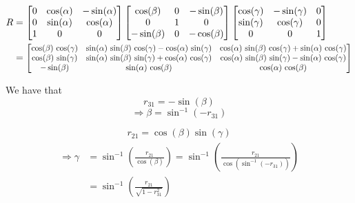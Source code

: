 \begin{align}
    R & =
    \begin{bmatrix}
        0 & \cos(\alpha) & -\sin(\alpha) \\
        0 & \sin(\alpha) & \cos(\alpha)  \\
        1 & 0            & 0             \\
    \end{bmatrix}
    \begin{bmatrix}
        \cos(\beta)  & 0 & -\sin(\beta) \\
        0            & 1 & 0            \\
        -\sin(\beta) & 0 & -\cos(\beta)
    \end{bmatrix}
    \begin{bmatrix}
        \cos(\gamma) & -\sin(\gamma) & 0 \\
        \sin(\gamma) & \cos(\gamma)  & 0 \\
        0            & 0             & 1
    \end{bmatrix} \nonumber \\
      & =
    \scalemath{0.85}{
        \begin{bmatrix}
            \cos(\beta)\,\cos(\gamma) & \sin(\alpha)\,\sin(\beta)\,\cos(\gamma) - \cos(\alpha)\,\sin(\gamma) & \cos(\alpha)\,\sin(\beta)\,\cos(\gamma) + \sin(\alpha)\,\cos(\gamma) \\
            \cos(\beta)\,\sin(\gamma) & \sin(\alpha)\,\sin(\beta)\,\sin(\gamma) + \cos(\alpha)\,\cos(\gamma) & \cos(\alpha)\,\sin(\beta)\,\sin(\gamma) - \sin(\alpha)\,\cos(\gamma) \\
            -\sin(\beta)              & \sin(\alpha)\,\cos(\beta)                                            & \cos(\alpha)\,\cos(\beta)
        \end{bmatrix}
    }
\end{align}

We have that
\begin{equation*}
    r_{31} = -\sin(\beta) \nonumber
\end{equation*}
\begin{equation}
    \Rightarrow \beta = \sin^{-1}(-r_{31})
\end{equation}

\begin{equation*}
    r_{21} = \cos(\beta)\sin(\gamma)
\end{equation*}
\begin{align}
    \begin{split}
        \Rightarrow \gamma & = \sin^{-1}\left(\frac{r_{21}}{\cos(\beta)}\right)               = \sin^{-1}\left(\frac{r_{21}}{\cos(\sin^{-1}(-r_{31}))}\right) \\
        & = \sin^{-1}\left(\frac{r_{21}}{\sqrt{1-r_{31}^2}}\right)
    \end{split}
\end{align}

